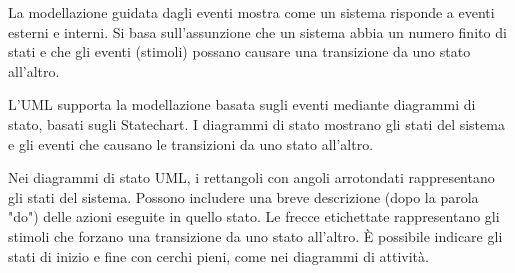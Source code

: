 La modellazione guidata dagli eventi mostra come un sistema risponde a eventi esterni e interni. Si basa sull'assunzione che un sistema abbia un numero finito di stati e che gli eventi (stimoli) possano causare una transizione da uno stato all'altro.

L’UML supporta la modellazione basata sugli eventi mediante diagrammi di stato, basati sugli Statechart. I diagrammi di stato mostrano gli stati del sistema e gli eventi che causano le transizioni da uno stato all’altro.

Nei diagrammi di stato UML, i rettangoli con angoli arrotondati rappresentano gli stati del sistema. Possono includere una breve descrizione (dopo la parola "do") delle azioni eseguite in quello stato. Le frecce etichettate rappresentano gli stimoli che forzano una transizione da uno stato all'altro. È possibile indicare gli stati di inizio e fine con cerchi pieni, come nei diagrammi di attività.

